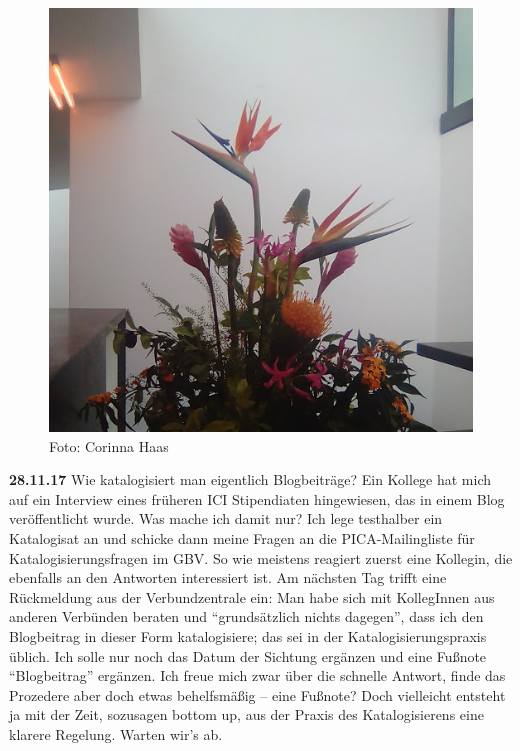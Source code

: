 \documentclass[a4paper,
fontsize=11pt,
oneside,
numbers=noperiodatend,
parskip=half-,
bibliography=totoc,
final
]{scrartcl}
\begin{document}
\begin{figure}
\centering
\includegraphics{img/Haas_4.png}
\caption{Foto: Corinna Haas}
\end{figure}

\textbf{28.11.17} Wie katalogisiert man eigentlich Blogbeiträge? Ein
Kollege hat mich auf ein Interview eines früheren ICI Stipendiaten
hingewiesen, das in einem Blog veröffentlicht wurde. Was mache ich damit
nur? Ich lege testhalber ein Katalogisat an und schicke dann meine
Fragen an die PICA-Mailingliste für Katalogisierungsfragen im GBV. So
wie meistens reagiert zuerst eine Kollegin, die ebenfalls an den
Antworten interessiert ist. Am nächsten Tag trifft eine Rückmeldung aus
der Verbundzentrale ein: Man habe sich mit KollegInnen aus anderen
Verbünden beraten und \enquote{grundsätzlich nichts dagegen}, dass ich
den Blogbeitrag in dieser Form katalogisiere; das sei in der
Katalogisierungspraxis üblich. Ich solle nur noch das Datum der Sichtung
ergänzen und eine Fußnote \enquote{Blogbeitrag} ergänzen. Ich freue mich
zwar über die schnelle Antwort, finde das Prozedere aber doch etwas
behelfsmäßig -- eine Fußnote? Doch vielleicht entsteht ja mit der Zeit,
sozusagen bottom up, aus der Praxis des Katalogisierens eine klarere
Regelung. Warten wir's ab.
\end{document}
